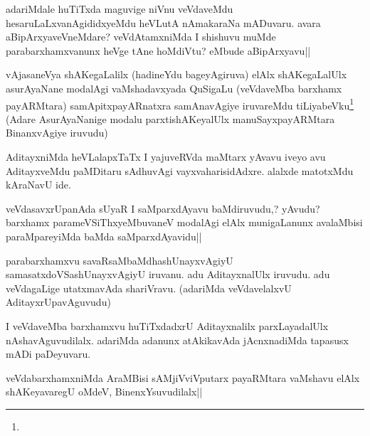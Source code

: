 
\begin{artha}
adariMdale huTiTxda maguvige niVnu veVdaveMdu 
hesaruLaLxvanAgididxyeMdu heVLutA nAmakaraNa mADuvaru. avara 
aBipArxyaveVneMdare? veVdAtamxniMda I shishuvu muMde 
parabarxhamxvanunx heVge tAne hoMdiVtu? eMbude aBipArxyavu||
\end{artha}


\begin{artha}
vAjasaneVya shAKegaLalilx (hadineYdu bageyAgiruva) elAlx shAKegaLalUlx 
asurAyaNane modalAgi vaMshadavxyada QuSigaLu (veVdaveMba barxhamx 
payARMtara) samApitxpayARnatxra samAnavAgiye iruvareMdu 
tiLiyabeVku\footnote[1]{} (Adare AsurAyaNanige modalu 
parxtishAKeyalUlx manuSayxpayARMtara BinanxvAgiye iruvudu)
\end{artha}


\begin{artha}
AditayxniMda heVLalapxTaTx I yajuveRVda maMtarx yAvavu iveyo avu 
AditayxveMdu paMDitaru sAdhuvAgi vayxvaharisidAdxre. alalxde matotxMdu 
kAraNavU ide.
\end{artha}

\begin{artha}
veVdasavxrUpanAda sUyaR I saMparxdAyavu baMdiruvudu,? yAvudu? barxhamx 
parameVSiThxyeMbuvaneV modalAgi elAlx munigaLanunx avalaMbisi 
paraMpareyiMda baMda saMparxdAyavidu||
\end{artha}

\begin{artha}
parabarxhamxvu savaRsaMbaMdhashUnayxvAgiyU samasatxdoVSashUnayxvAgiyU 
iruvanu. adu AditayxnalUlx iruvudu. adu veVdagaLige utatxmavAda 
shariVravu. (adariMda veVdavelalxvU AditayxrUpavAguvudu)
\end{artha}

\begin{artha}
I veVdaveMba barxhamxvu huTiTxdadxrU Aditayxnalilx parxLayadalUlx 
nAshavAguvudilalx. adariMda adanunx atAkikavAda jAcnxnadiMda tapasusx 
mADi paDeyuvaru.
\end{artha}

\begin{artha}
veVdabarxhamxniMda AraMBisi sAMjiVviVputarx payaRMtara vaMshavu elAlx 
shAKeyavaregU oMdeV, BinenxYsuvudilalx||
\end{artha}

